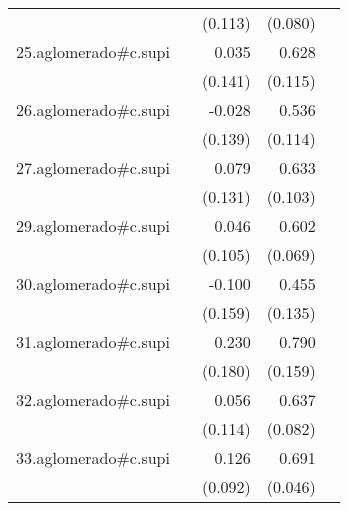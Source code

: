 {\begin{longtable}{l*{4}{D{.}{.}{-1}}}
            &                     &     (0.113)         &     (0.080)         &                     \\
\addlinespace
25.aglomerado#c.supi&                     &       0.035         &       0.628\sym{***}&                     \\
            &                     &     (0.141)         &     (0.115)         &                     \\
\addlinespace
26.aglomerado#c.supi&                     &      -0.028         &       0.536\sym{***}&                     \\
            &                     &     (0.139)         &     (0.114)         &                     \\
\addlinespace
27.aglomerado#c.supi&                     &       0.079         &       0.633\sym{***}&                     \\
            &                     &     (0.131)         &     (0.103)         &                     \\
\addlinespace
29.aglomerado#c.supi&                     &       0.046         &       0.602\sym{***}&                     \\
            &                     &     (0.105)         &     (0.069)         &                     \\
\addlinespace
30.aglomerado#c.supi&                     &      -0.100         &       0.455\sym{***}&                     \\
            &                     &     (0.159)         &     (0.135)         &                     \\
\addlinespace
31.aglomerado#c.supi&                     &       0.230         &       0.790\sym{***}&                     \\
            &                     &     (0.180)         &     (0.159)         &                     \\
\addlinespace
32.aglomerado#c.supi&                     &       0.056         &       0.637\sym{***}&                     \\
            &                     &     (0.114)         &     (0.082)         &                     \\
\addlinespace
33.aglomerado#c.supi&                     &       0.126         &       0.691\sym{***}&                     \\
            &                     &     (0.092)         &     (0.046)         &                     \\

\end{longtable}}
